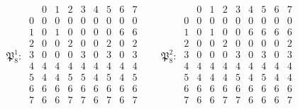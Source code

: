 \documentclass[11pt]{amsart}
\theoremstyle{definition}
\begin{document}
{\scriptsize
\begin{gather*}
\mathfrak P_8^{1}:\ \begin{array}{c|cccccccc} & 0 & 1 & 2 & 3 & 4 & 5 & 6 & 7\\ \hline 0 & 0 & 0 & 0 & 0 & 0 & 0 & 0 & 0\\ 1 & 0 & 1 & 0 & 0 & 0 & 0 & 6 & 6\\ 2 & 0 & 0 & 2 & 0 & 0 & 2 & 0 & 2\\ 3 & 0 & 0 & 0 & 3 & 0 & 3 & 0 & 3\\ 4 & 4 & 4 & 4 & 4 & 4 & 4 & 4 & 4\\ 5 & 4 & 4 & 5 & 5 & 4 & 5 & 4 & 5\\ 6 & 6 & 6 & 6 & 6 & 6 & 6 & 6 & 6\\ 7 & 6 & 6 & 7 & 7 & 6 & 7 & 6 & 7\\\end{array}\qquad \mathfrak P_8^{2}:\ \begin{array}{c|cccccccc} & 0 & 1 & 2 & 3 & 4 & 5 & 6 & 7\\ \hline 0 & 0 & 0 & 0 & 0 & 0 & 0 & 0 & 0\\ 1 & 0 & 1 & 0 & 0 & 6 & 6 & 6 & 6\\ 2 & 0 & 0 & 2 & 0 & 0 & 0 & 0 & 2\\ 3 & 0 & 0 & 0 & 3 & 0 & 3 & 0 & 3\\ 4 & 4 & 4 & 4 & 4 & 4 & 4 & 4 & 4\\ 5 & 4 & 4 & 4 & 5 & 4 & 5 & 4 & 4\\ 6 & 6 & 6 & 6 & 6 & 6 & 6 & 6 & 6\\ 7 & 6 & 6 & 7 & 7 & 6 & 6 & 6 & 7\\\end{array}\\[1ex]

\end{gather*}}
\end{document}
